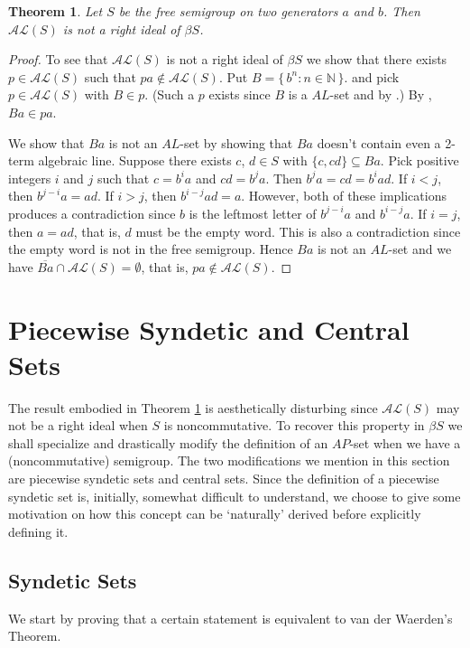 \documentclass[12pt,showtrims]{memoir}
\theoremstyle{plain}
\newtheorem{thm}{Theorem}[section]
\theoremstyle{definition}
\newcommand{\bbN}{\mathbb{N}}
\newcommand{\AL}{\mathcal{AL}}
\begin{document}
\begin{thm}
  \label{thm:AL-not-left-ideal}
  Let $S$ be the free semigroup on two generators $a$ and $b$.
  Then $\AL(S)$ is not a right ideal of $\beta S$.
\end{thm}
\begin{proof}
  To see that $\AL(S)$ is not a right ideal of $\beta S$ we show that there exists $p \in \AL(S)$ such that $pa \not\in \AL(S)$. 
  Put $B = \{\, b^n : n \in \bbN \,\}$. and pick $p \in \AL(S)$ with $B \in p$. 
  (Such a $p$ exists since $B$ is a $AL$-set and by \cite[Theorem 3.11]{Hindman:1998fk}.)
  By \cite[Exercise 4.1.8(b)]{Hindman:1998fk}, $Ba \in pa$. 

  We show that $Ba$ is not an $AL$-set by showing that $Ba$ doesn't contain even a 2-term algebraic line. 
  Suppose there exists $c$, $d \in S$ with $\{c, cd\} \subseteq Ba$. 
  Pick positive integers $i$ and $j$ such that $c = b^ia$ and $cd = b^ja$.
  Then $b^ja = cd = b^iad$.
  If $i < j$, then $b^{j-i}a = ad$.
  If $i > j$, then $b^{i-j}ad = a$.
  However, both of these implications produces a contradiction since $b$ is the leftmost letter of $b^{j-i}a$ and $b^{i-j}a$.
  If $i = j$, then $a = ad$, that is, $d$ must be the empty word.
  This is also a contradiction since the empty word is not in the free semigroup.
  Hence $Ba$ is not an $AL$-set and we have $\overline{Ba} \cap \AL(S) = \emptyset$, that is, $pa \not\in \AL(S)$. 
\end{proof}

\section{Piecewise Syndetic and Central Sets}
The result embodied in Theorem \ref{thm:AL-not-left-ideal} is aesthetically disturbing since $\AL(S)$ may not be a right ideal when $S$ is noncommutative. 
To recover this property in $\beta S$ we shall specialize and drastically modify the definition of an $AP$-set when we have a (noncommutative) semigroup.
The two modifications we mention in this section are piecewise syndetic sets and central sets.
Since the definition of a piecewise syndetic set is, initially, somewhat difficult to understand, we choose to give some motivation on how this concept can be `naturally' derived before explicitly defining it.


\subsection{Syndetic Sets}
We start by proving that a certain statement is equivalent to van der Waerden's Theorem.
\end{document}
